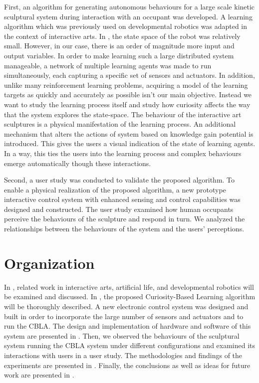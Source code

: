First, an algorithm for generating autonomous behaviours for a large scale kinetic sculptural system during interaction with an occupant was developed. A learning algorithm which was previously used on developmental robotics was adapted in the context of interactive arts. In \cite{Oudeyer2007}, the state space of the robot was relatively small. However, in our case, there is an order of magnitude more input and output variables. In order to make learning such a large distributed system manageable, a network of multiple learning agents was made to run simultaneously, each capturing a specific set of sensors and actuators. In addition, unlike many reinforcement learning problems, acquiring a model of the learning targets as quickly and accurately as possible isn't our main objective. Instead we want to study the learning process itself and study how curiosity affects the way that the system explores the state-space. The behaviour of the interactive art sculptures is a physical manifestation of the learning process. An additional mechanism that alters the actions of system based on knowledge gain potential is introduced. This gives the users a visual indication of the state of learning agents. In a way, this ties the users into the learning process and complex behaviours emerge automatically though these interactions. 

Second, a user study was conducted to validate the proposed algorithm. To enable a physical realization of the proposed algorithm, a new prototype interactive control system with enhanced sensing and control capabilities was designed and constructed. The user study examined how human occupants perceive the behaviours of the sculpture and respond in turn. We analyzed the relationships between the behaviours of the system and the users' perceptions. 


\section{Organization}

In , related work in interactive arts, artificial life, and developmental robotics will be examined and discussed. In , the proposed Curiosity-Based Learning algorithm will be thoroughly described. A new electronic control system was designed and built in order to incorporate the large number of sensors and actuators and to run the CBLA. The design and implementation of hardware and software of this system are presented in . Then, we observed the behaviours of the sculptural system running the CBLA system under different configurations and examined its interactions with users in a user study. The methodologies and findings of the experiments are presented in . Finally, the conclusions as well as ideas for future work are presented in .
